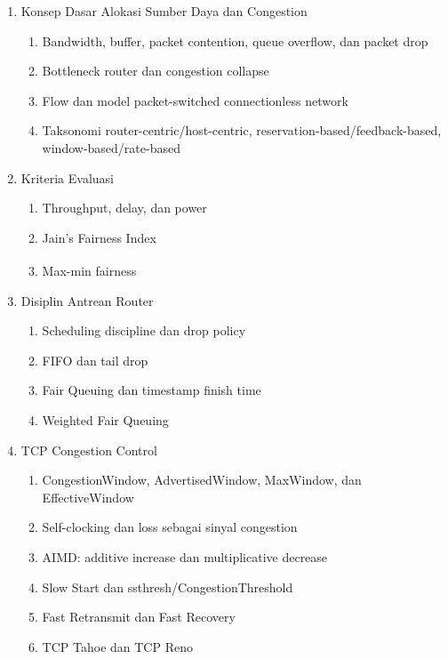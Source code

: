 \begin{enumerate}
    \item \pwajib Konsep Dasar Alokasi Sumber Daya dan Congestion
    \begin{enumerate}
        \item \pwajib Bandwidth, buffer, packet contention, queue overflow, dan packet drop
        \item \pwajib Bottleneck router dan congestion collapse
        \item \pwajib Flow dan model packet-switched connectionless network
        \item \ppaham Taksonomi router-centric/host-centric, reservation-based/feedback-based, window-based/rate-based
    \end{enumerate}
    \item \pwajib Kriteria Evaluasi
    \begin{enumerate}
        \item \pwajib Throughput, delay, dan power
        \item \pwajib Jain's Fairness Index
        \item \ppaham Max-min fairness\textsuperscript{\dag}
    \end{enumerate}
    \item \pwajib Disiplin Antrean Router
    \begin{enumerate}
        \item \pwajib Scheduling discipline dan drop policy
        \item \pwajib FIFO dan tail drop
        \item \pwajib Fair Queuing dan timestamp finish time
        \item \ppaham Weighted Fair Queuing
    \end{enumerate}
    \item \pwajib TCP Congestion Control
    \begin{enumerate}
        \item \pwajib CongestionWindow, AdvertisedWindow, MaxWindow, dan EffectiveWindow
        \item \pwajib Self-clocking dan loss sebagai sinyal congestion
        \item \pwajib AIMD: additive increase dan multiplicative decrease
        \item \pwajib Slow Start dan ssthresh/CongestionThreshold
        \item \pwajib Fast Retransmit dan Fast Recovery
        \item \ppaham TCP Tahoe dan TCP Reno

\end{enumerate}
\end{enumerate}
